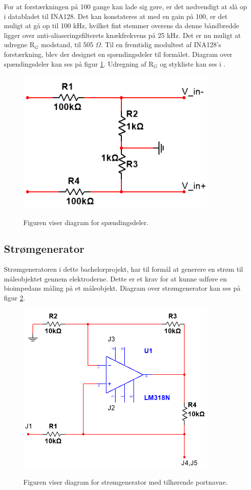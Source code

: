For at forstærkningen på 100 gange kan lade sig gøre, er det nødvendigt at slå op i databladet til INA128. Det kan konstateres at med en gain på 100, er det muligt at gå op til 100 kHz, hvilket fint stemmer overens da denne båndbredde  ligger over anti-aliaseringsfilterets knækfrekvens på 25 kHz. Det er nu muligt at udregne R$_{G}$ modstand, til 505 $\Omega$. Til en fremtidig modultest af INA128's forstærkning, blev der designet en spændingsdeler til formålet. Diagram over spændingsdeler kan ses på figur \ref{fig:spaedingdeler}. Udregning af R$_{G}$ og stykliste kan ses i .

\begin{figure}[H]
\centering
{\includegraphics[width=10cm]
{Figure/spaedingdeler}}
\caption{Figuren viser diagram for spændingsdeler.}
\label{fig:spaedingdeler}
\end{figure}

 
 
\subsection{Strømgenerator}
Strømgeneratoren i dette bachelorprojekt, har til formål at generere en strøm til måleobjektet gennem elektroderne. Dette er et krav for at kunne udføre en bioimpedans måling på et måleobjekt\cite{Brantlov2017}. Diagram over strømgenerator kan ses på figur \ref{fig:StromgeneratorLM318}.

\begin{figure}[H]
\centering
{\includegraphics[width=10cm]
{Figure/StromgeneratorLM318}}
\caption{Figuren viser diagram for strømgenerator med tilhørende portnavne.}
\label{fig:StromgeneratorLM318}
\end{figure}

